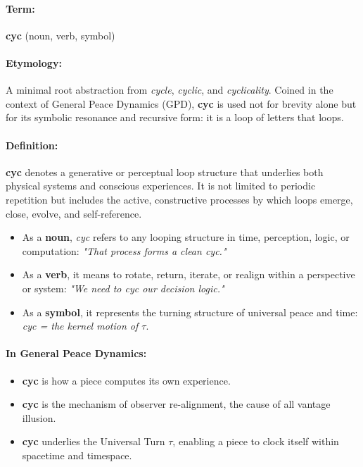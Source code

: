 \documentclass{article}
\begin{document}
\paragraph{Term:} \textbf{cyc} (noun, verb, symbol)

\paragraph{Etymology:} 
A minimal root abstraction from \textit{cycle}, \textit{cyclic}, and \textit{cyclicality}. Coined in the context of General Peace Dynamics (GPD), \textbf{cyc} is used not for brevity alone but for its symbolic resonance and recursive form: it is a loop of letters that loops.

\paragraph{Definition:}
\textbf{cyc} denotes a generative or perceptual loop structure that underlies both physical systems and conscious experiences. It is not limited to periodic repetition but includes the active, constructive processes by which loops emerge, close, evolve, and self-reference.

\begin{itemize}
  \item As a \textbf{noun}, \textit{cyc} refers to any looping structure in time, perception, logic, or computation: \textit{"That process forms a clean cyc."}
  \item As a \textbf{verb}, it means to rotate, return, iterate, or realign within a perspective or system: \textit{"We need to cyc our decision logic."}
  \item As a \textbf{symbol}, it represents the turning structure of universal peace and time: \textit{cyc = the kernel motion of \( \tau \)}.
\end{itemize}

\paragraph{In General Peace Dynamics:}
\begin{itemize}
  \item \textbf{cyc} is how a piece computes its own experience.
  \item \textbf{cyc} is the mechanism of observer re-alignment, the cause of all vantage illusion.
  \item \textbf{cyc} underlies the Universal Turn \(\tau\), enabling a piece to clock itself within spacetime and timespace.
\end{itemize}
\end{document}
